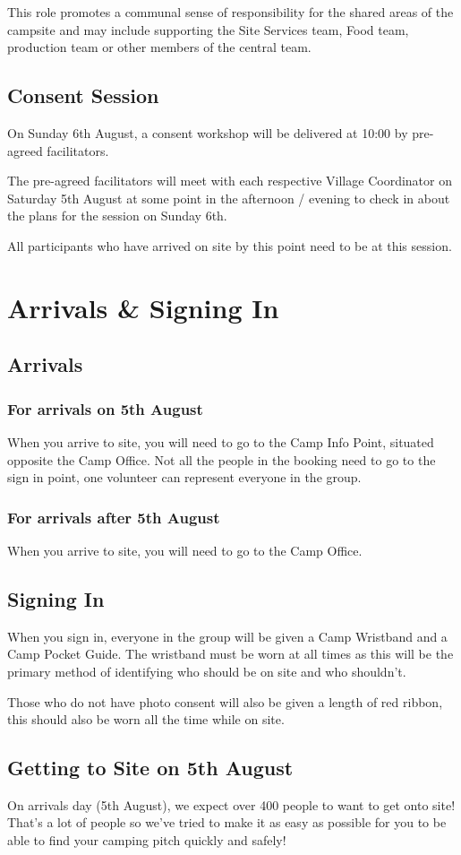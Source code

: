 \documentclass[a4paper, 11pt]{report}
\begin{document}
This role promotes a communal sense of responsibility for the shared areas of the campsite and may include supporting the Site Services team, Food team, production team or other members of the central team.

\section{Consent Session}
On Sunday 6th August, a consent workshop will be delivered at 10:00 by pre-agreed facilitators.\nl

The pre-agreed facilitators will meet with each respective Village Coordinator on Saturday 5th August at some point in the afternoon / evening to check in about the plans for the session on Sunday 6th. \nl

All participants who have arrived on site by this point need to be at this session. 

\chapter{Arrivals \& Signing In}
\section{Arrivals}
\subsection{For arrivals on 5th August}
When you arrive to site, you will need to go to the Camp Info Point, situated opposite the Camp Office. Not all the people in the booking need to go to the sign in point, one volunteer can represent everyone in the group. 
\subsection{For arrivals after 5th August}
When you arrive to site, you will need to go to the Camp Office.
\section{Signing In}
When you sign in, everyone in the group will be given a Camp Wristband and a Camp Pocket Guide. The wristband must be worn at all times as this will be the primary method of identifying who should be on site and who shouldn't.\nl

Those who do not have photo consent will also be given a length of red ribbon, this should also be worn all the time while on site. 
\section{Getting to Site on 5th August}
On arrivals day (5th August), we expect over 400 people to want to get onto site! That's a lot of people so we've tried to make it as easy as possible for you to be able to find your camping pitch quickly and safely!\nl
\end{document}
